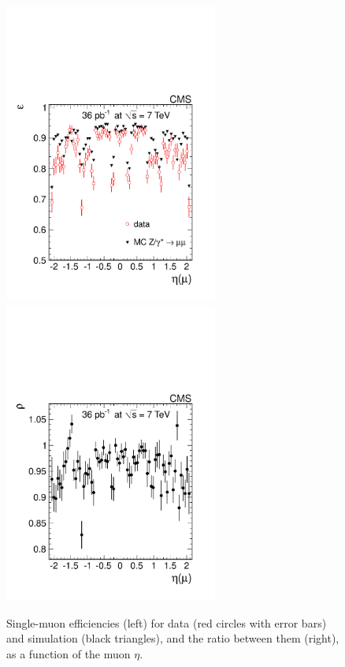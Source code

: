 
\begin{figure}
  \begin{center}
  \includegraphics[width=7cm]{figs/efficiency_eta.pdf}%
  \includegraphics[width=7cm]{figs/correction_factor_eta.pdf}
  \end{center}
\caption{Single-muon efficiencies (left) for data (red circles with error bars)
 and simulation (black triangles), and the ratio between them (right), as a function of the muon $\eta$.}
\label{rho_eta}
\end{figure}
